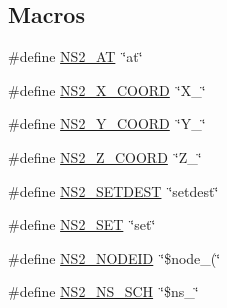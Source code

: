 \subsection*{Macros}
\begin{DoxyCompactItemize}
\item 
\#define \hyperlink{ns2-mobility-helper_8cc_a18c3ed1fd6f7c274962671fa9e1d6c6b}{N\+S2\+\_\+\+AT}~\char`\"{}at\char`\"{}
\item 
\#define \hyperlink{ns2-mobility-helper_8cc_afebbe1b096a0ca356811533fca7dc70b}{N\+S2\+\_\+\+X\+\_\+\+C\+O\+O\+RD}~\char`\"{}X\+\_\+\char`\"{}
\item 
\#define \hyperlink{ns2-mobility-helper_8cc_a6f8559f89758bd5343b3b022ec1a64a6}{N\+S2\+\_\+\+Y\+\_\+\+C\+O\+O\+RD}~\char`\"{}Y\+\_\+\char`\"{}
\item 
\#define \hyperlink{ns2-mobility-helper_8cc_a885233d926c5a5c8ddef467384fbd052}{N\+S2\+\_\+\+Z\+\_\+\+C\+O\+O\+RD}~\char`\"{}Z\+\_\+\char`\"{}
\item 
\#define \hyperlink{ns2-mobility-helper_8cc_a7713c6cccbee03bdbf07a78c64fba89f}{N\+S2\+\_\+\+S\+E\+T\+D\+E\+ST}~\char`\"{}setdest\char`\"{}
\item 
\#define \hyperlink{ns2-mobility-helper_8cc_adcd9c6598e967af36bd207230f054696}{N\+S2\+\_\+\+S\+ET}~\char`\"{}set\char`\"{}
\item 
\#define \hyperlink{ns2-mobility-helper_8cc_a83508d592258453bdfac784001a29207}{N\+S2\+\_\+\+N\+O\+D\+E\+ID}~\char`\"{}\$node\+\_\+(\char`\"{}
\item 
\#define \hyperlink{ns2-mobility-helper_8cc_af1ec3f0e6114356ee97ae5ab2de320aa}{N\+S2\+\_\+\+N\+S\+\_\+\+S\+CH}~\char`\"{}\$ns\+\_\+\char`\"{}
\end{DoxyCompactItemize}
